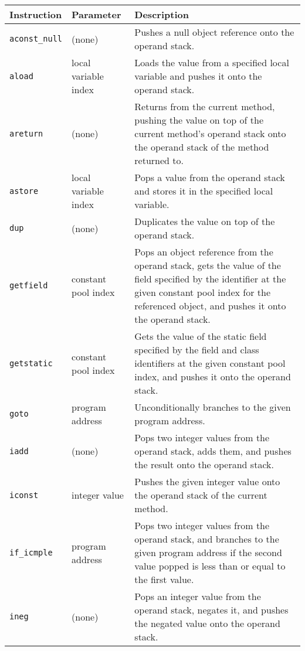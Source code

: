 \begin{table}
  \centering
  \begin{tabular}{llp{8.5cm}}
    \hline
    Instruction & Parameter & Description \\
    \hline
    \texttt{aconst\_null} & (none) & 
    Pushes a null object reference onto the operand stack.
    \\
    \texttt{aload} & local variable index &
    Loads the value from a specified local variable and pushes it
    onto the operand stack.
    \\
    \texttt{areturn} & (none) &
    Returns from the current method, pushing the value on top of the
    current method's operand stack onto the operand stack of the
    method returned to.
    \\
    \texttt{astore} & local variable index &
    Pops a value from the operand stack and stores it in the specified
    local variable.
    \\
    \texttt{dup} & (none) &
    Duplicates the value on top of the operand stack.
    \\
    \texttt{getfield} & constant pool index &
    Pops an object reference from the operand stack, gets the value of
    the field specified by the identifier at the given constant pool
    index for the referenced object, and pushes it onto the operand
    stack.
    \\
    \texttt{getstatic} & constant pool index &
    Gets the value of the static field specified by the field and
    class identifiers at the given constant pool index, and pushes it
    onto the operand stack.
    \\
    \texttt{goto} & program address &
    Unconditionally branches to the given program address.
    \\
    \texttt{iadd} & (none) &
    Pops two integer values from the operand stack, adds them, and
    pushes the result onto the operand stack.
    \\
    \texttt{iconst} & integer value &
    Pushes the given integer value onto the operand stack of the
    current method.
    \\
    \texttt{if\_icmple} & program address &
    Pops two integer values from the operand stack, and branches to
    the given program address if the second value popped is less than
    or equal to the first value.
    \\
    \texttt{ineg} & (none) &
    Pops an integer value from the operand stack, negates it, and
    pushes the negated value onto the operand stack.

\end{tabular}
\end{table}
